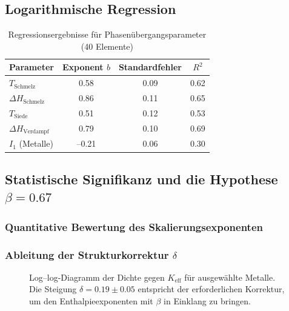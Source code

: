 \documentclass[12pt,a4paper]{article}
\theoremstyle{remark}
\newcommand{\Keff}{K_{\mathrm{eff}}}
\begin{document}
	\subsection{Logarithmische Regression}
	\begin{table}[htbp]
		\centering
		\caption{Regressionsergebnisse für Phasenübergangsparameter (40 Elemente)}
		\label{tab:regression}
		\begin{tabular}{@{}lccc@{}}
			\toprule
			\textbf{Parameter} & \textbf{Exponent }\(b\) & \textbf{Standardfehler} & \textbf{\(R^2\)} \\
			\midrule
			\(T_{\text{Schmelz}}\)   & 0.58 & 0.09 & 0.62 \\
			\(\Delta H_{\text{Schmelz}}\) & 0.86 & 0.11 & 0.65 \\
			\(T_{\text{Siede}}\)   & 0.51 & 0.12 & 0.53 \\
			\(\Delta H_{\text{Verdampf}}\) & 0.79 & 0.10 & 0.69 \\
			\(I_1\) (Metalle)      & --0.21 & 0.06 & 0.30 \\
			\bottomrule
		\end{tabular}
	\end{table}
	
	\subsection{Statistische Signifikanz und die Hypothese \(\beta = 0.67\)}
	\subsubsection{Quantitative Bewertung des Skalierungsexponenten}
	\subsubsection{Ableitung der Strukturkorrektur \(\delta\)}
	
	\begin{figure}[htbp]
		\centering
		\caption{Log–log-Diagramm der Dichte gegen \(\Keff\) für ausgewählte Metalle. Die Steigung \(\delta = 0.19 \pm 0.05\) entspricht der erforderlichen Korrektur, um den Enthalpieexponenten mit \(\beta\) in Einklang zu bringen.}
		\label{fig:density_scaling}
	\end{figure}
	
\end{document}
